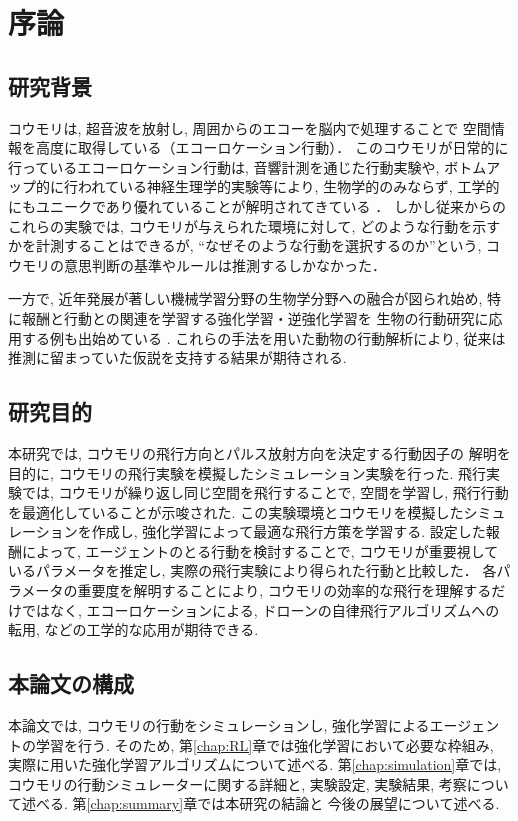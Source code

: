 \documentclass[../main]{subfiles}
\begin{document}
\newpage
\chapter{序論}


\section{研究背景}
コウモリは, 超音波を放射し, 周囲からのエコーを脳内で処理することで
空間情報を高度に取得している（エコーロケーション行動）．
このコウモリが日常的に行っているエコーロケーション行動は, 
音響計測を通じた行動実験や, 
ボトムアップ的に行われている神経生理学的実験等により, 
生物学的のみならず, 
工学的にもユニークであり優れていることが解明されてきている
\cite{ref:bat_enhance}\cite{ref:echolocating_bats}．
しかし従来からのこれらの実験では, 
コウモリが与えられた環境に対して, 
どのような行動を示すかを計測することはできるが, 
“なぜそのような行動を選択するのか”という, 
コウモリの意思判断の基準やルールは推測するしかなかった．

一方で, 近年発展が著しい機械学習分野の生物学分野への融合が図られ始め, 
特に報酬と行動との関連を学習する強化学習・逆強化学習を
生物の行動研究に応用する例も出始めている
\cite{ref:simulating_bout}\cite{ref:can_ai}.
これらの手法を用いた動物の行動解析により, 
従来は推測に留まっていた仮説を支持する結果が期待される.


\section{研究目的}
本研究では, コウモリの飛行方向とパルス放射方向を決定する行動因子の
解明を目的に, コウモリの飛行実験を模擬したシミュレーション実験を行った.
飛行実験では, コウモリが繰り返し同じ空間を飛行することで, 
空間を学習し, 飛行行動を最適化していることが示唆された.
この実験環境とコウモリを模擬したシミュレーションを作成し, 
強化学習によって最適な飛行方策を学習する.
設定した報酬によって, エージェントのとる行動を検討することで, 
コウモリが重要視しているパラメータを推定し, 
実際の飛行実験により得られた行動と比較した．
各パラメータの重要度を解明することにより, 
コウモリの効率的な飛行を理解するだけではなく, 
エコーロケーションによる, 
ドローンの自律飛行アルゴリズムへの転用, 
などの工学的な応用が期待できる.


\section{本論文の構成}
本論文では, コウモリの行動をシミュレーションし, 
強化学習によるエージェントの学習を行う.
そのため, 第\ref{chap:RL}章では強化学習において必要な枠組み, 
実際に用いた強化学習アルゴリズムについて述べる.
第\ref{chap:simulation}章では, 
コウモリの行動シミュレーターに関する詳細と, 
実験設定, 実験結果, 考察について述べる.
第\ref{chap:summary}章では本研究の結論と
今後の展望について述べる.
\end{document}
